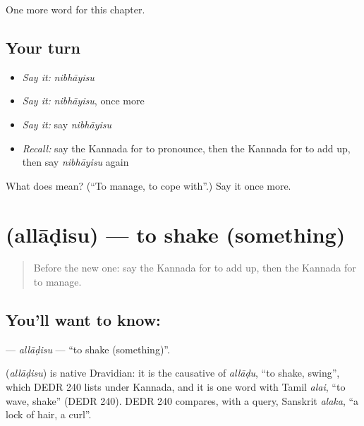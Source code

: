 \begin{grammarlens}[title={What you've built}]
One more word for this chapter.
\end{grammarlens}

\subsection*{Your turn}
\begin{itemize}
\raggedright
  \item \emph{Say it:} \emph{nibhāyisu}
  \item \emph{Say it:} \emph{nibhāyisu}, once more
  \item \emph{Say it:} say \emph{nibhāyisu}
  \item \emph{Recall:} say the Kannada for to pronounce, then the Kannada for to add up, then say \emph{nibhāyisu} again
\end{itemize}

\begin{tcolorbox}[breakable,colback=teal!4,colframe=teal!35!black,title={Before you move on}]
What does  mean? (\textquotedblleft{}To manage, to cope with\textquotedblright{}.) Say it once more.
\end{tcolorbox}
\section[\texorpdfstring{\kn{ಅಲ್ಲಾಡಿಸು} (allāḍisu)}{ಅಲ್ಲಾಡಿಸು (allāḍisu)}]{ (allāḍisu) — to shake (something)}

\label{lesson:KA-C243-alladisu}



\begin{quote}
Before the new one: say the Kannada for to add up, then the Kannada for to manage.
\end{quote}

\subsection*{You'll want to know: }
\textbf{} — \emph{allāḍisu} — \textquotedblleft{}to shake (something)\textquotedblright{}.

\begin{cousinweb}
\textbf{} (\emph{allāḍisu}) is native Dravidian: it is the causative of \emph{allāḍu}, \textquotedblleft{}to shake, swing\textquotedblright{}, which DEDR 240 lists under Kannada, and it is one word with Tamil \emph{alai}, \textquotedblleft{}to wave, shake\textquotedblright{} (DEDR 240). DEDR 240 compares, with a query, Sanskrit \emph{alaka}, \textquotedblleft{}a lock of hair, a curl\textquotedblright{}.
\end{cousinweb}

